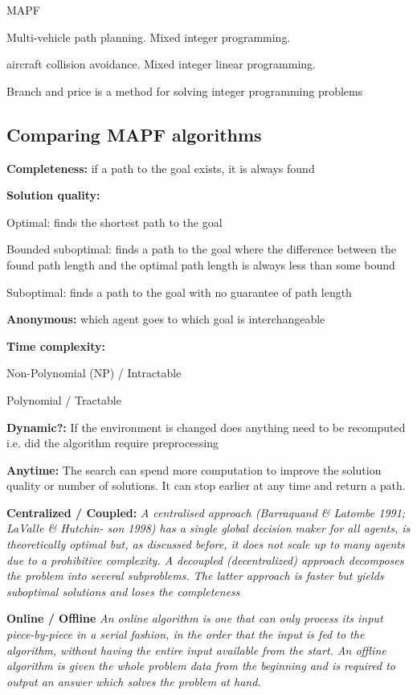 \documentclass[a4paper,11pt]{article}
\begin{document}
MAPF

\cite{schouwenaars2001mixed} Multi-vehicle path planning. Mixed integer programming.

\cite{richards2002aircraft} aircraft collision avoidance. Mixed integer linear programming.

Branch and price is a method for solving integer programming problems





\subsection{Comparing MAPF algorithms}

{\setlength{\parindent}{0cm}

\textbf{Completeness:} if a path to the goal exists, it is always found

\textbf{Solution quality:}
	\begin{compactitem}
		\item Optimal: finds the shortest path to the goal
		\item Bounded suboptimal: finds a path to the goal where the difference between the found path length and the optimal path length is always less than some bound
		\item Suboptimal: finds a path to the goal with no guarantee of path length
	\end{compactitem}

\textbf{Anonymous:} which agent goes to which goal is interchangeable

\textbf{Time complexity:}
	\begin{compactitem}
		\item Non-Polynomial (NP) / Intractable
		\item Polynomial / Tractable
	\end{compactitem}

\textbf{Dynamic?:} If the environment is changed does anything need to be recomputed i.e. did the algorithm require preprocessing

\textbf{Anytime:} The search can spend more computation to improve the solution quality or number of solutions. It can stop earlier at any time and return a path.

\textbf{Centralized / Coupled:} \textit{A centralised approach (Barraquand \& Latombe 1991; LaValle \& Hutchin- son 1998) has a single global decision maker for all agents, is theoretically optimal but, as discussed before, it does not scale up to many agents due to a prohibitive complexity. A decoupled (decentralized) approach decomposes the problem into several subproblems. The latter approach is faster but yields suboptimal solutions and loses the completeness} \cite{wang2008fast}

\textbf{Online / Offline} \textit{An online algorithm is one that can only process its input piece-by-piece in a serial fashion, in the order that the input is fed to the algorithm, without having the entire input available from the start. An offline algorithm is given the whole problem data from the beginning and is required to output an answer which solves the problem at hand.}
} %
\end{document}
